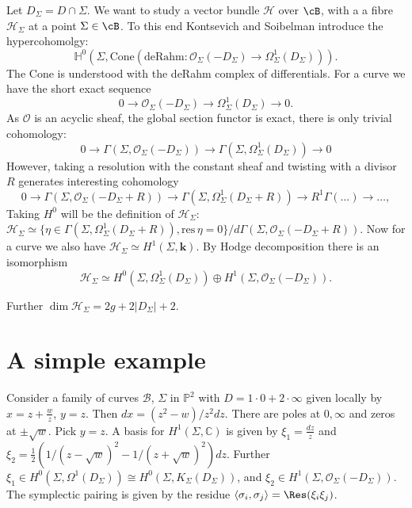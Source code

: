 Let \( D_\Sigma = D \cap \Sigma\). We want to study a vector bundle \( \mathcal{H}\) over \( \cB\), with a a fibre \( \mathcal{H}_\Sigma\) at a point \( \Sigma \in \cB \). To this end Kontsevich and Soibelman introduce the hypercohomolgy:
\[  \mathbb{H}^0(\Sigma, \mathrm{Cone}(\text{deRahm}:\mathcal{O}_\Sigma(-D_\Sigma) \rightarrow \Omega^1_\Sigma(D_\Sigma))). \]
The Cone is understood with the deRahm complex of differentials. For a curve we have the short exact sequence
\[ 0 \rightarrow \mathcal{O}_\Sigma(-D_\Sigma) \rightarrow \Omega^1_\Sigma( D_\Sigma) \rightarrow 0. \]
As \(\mathcal{O}\) is an acyclic sheaf, the global section functor is exact, there is only trivial cohomology:
\[ 0 \rightarrow \Gamma(\Sigma, \mathcal{O}_\Sigma(-D_\Sigma)) \rightarrow \Gamma(\Sigma, \Omega^1_\Sigma( D_\Sigma)) \rightarrow 0  \]
However, taking a resolution with the constant sheaf and twisting with a divisor \(R\) generates interesting cohomology 
\[ 0\rightarrow \Gamma(\Sigma,\mathcal{O}_\Sigma(-D_\Sigma+R)) \rightarrow  \Gamma(\Sigma,\Omega^1_{\Sigma}(D_\Sigma+R)) \rightarrow R^1 \Gamma( \dots )  \rightarrow \dots, \]
Taking \(H^0\) will be the definition of \( \mathcal{H}_\Sigma\):
\( \mathcal{H}_\Sigma \simeq \{ \eta \in \Gamma(\Sigma,\Omega^1_{\Sigma}(D_\Sigma+R)) , \mathrm{res}\, \eta = 0 \} / d \Gamma(\Sigma,\mathcal{O}_\Sigma(-D_\Sigma+R)). \)
Now for a curve we also have
 \( \mathcal{H}_\Sigma \simeq H^1(\Sigma, \mathbf{k})\).
By Hodge decomposition there is an isomorphism 
\[ \mathcal{H}_\Sigma \simeq H^0(\Sigma,\Omega_\Sigma^1(D_\Sigma) ) \oplus H^1(\Sigma, \mathcal{O}_\Sigma(-D_\Sigma)).\]

Further \( \dim \mathcal{H}_\Sigma = 2 g + 2 | D_\Sigma| + 2 \).



\section{A simple example} 


Consider a family of curves \(\mathcal{B}\), \( \Sigma\) in \( \mathbb{P}^2\) with \(D=1 \cdot 0+2 \cdot \infty\) given locally by \(  x = z + \frac{w}{z}  \), \(y=z\). 
Then
\( d x = ( z^2 - w)/z^2 dz\). There are poles at \( 0,\infty\) and zeros at \( \pm\sqrt{w}\). Pick \( y = z\). A basis for \( H^1(\Sigma,\mathbb{C})\) is given by \( \xi_1 = \frac{dz}{z}\) and \( \xi_2 = \frac{1}{2} ( 1/(z-\sqrt{w})^2 - 1/(z+\sqrt{w})^2) dz\). Further \(\xi_1 \in H^0(\Sigma,\Omega^1(D_\Sigma)) \cong H^0(\Sigma, K_\Sigma(D_\Sigma) )\), and \( \xi_2 \in H^1(\Sigma, \mathcal{O}_\Sigma(-D_\Sigma))\). The symplectic pairing is given by the residue \( \langle \sigma_i, \sigma_j \rangle = \Res( \xi_i \xi_j)\). 


